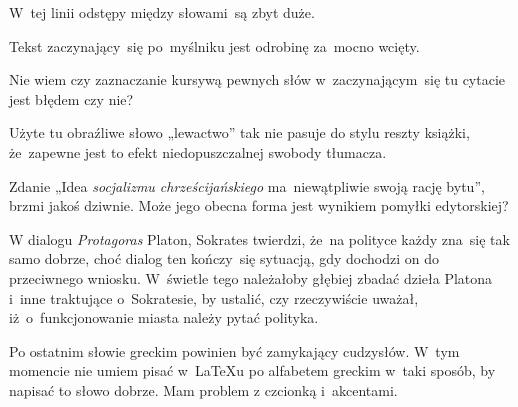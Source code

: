 \documentclass[a4paper,11pt]{article}
\begin{document}
\vspace{\spaceFour}





\start {} W~tej linii odstępy między słowami~są zbyt
duże.

\vspace{\spaceFour}





\start {} Tekst zaczynający~się po~myślniku jest odrobinę
za~mocno wcięty.

\vspace{\spaceFour}





\start {} Nie wiem czy zaznaczanie kursywą pewnych słów
w~zaczynającym~się tu cytacie jest błędem czy nie?

\vspace{\spaceFour}





\start {} Użyte tu obraźliwe słowo „lewactwo” tak nie
pasuje do stylu reszty książki, że~zapewne jest to efekt
niedopuszczalnej swobody tłumacza.

\vspace{\spaceFour}





\start {} Zdanie „Idea \textit{socjalizmu
  chrześcijańskiego} ma~niewątpliwie swoją rację bytu”, brzmi jakoś
dziwnie. Może jego obecna forma jest wynikiem pomyłki edytorskiej?

\vspace{\spaceFour}





\start {} W dialogu \textit{Protagoras} Platon, Sokrates
twierdzi, że~na polityce każdy zna~się tak samo dobrze, choć dialog
ten kończy~się sytuacją, gdy dochodzi on do przeciwnego wniosku.
W~świetle tego należałoby głębiej zbadać dzieła Platona i~inne
traktujące o~Sokratesie, by ustalić, czy rzeczywiście uważał,
iż~o~funkcjonowanie miasta należy pytać polityka.

\vspace{\spaceFour}





\start {} Po ostatnim słowie greckim powinien być
zamykający cudzysłów. W~tym momencie nie umiem pisać w~\LaTeX u po
alfabetem greckim w~taki sposób, by napisać to słowo dobrze. Mam
problem z czcionką i~akcentami.
\end{document}
